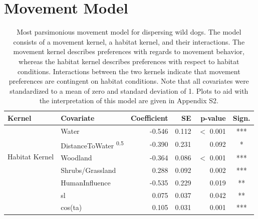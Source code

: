 \documentclass[abstract=off,10pt,a4paper,bibliography=totocnumbered]{article}
\begin{document}
\newpage
\section{Movement Model}
\begin{table}[htbp]
 \begin{center}
  \caption{Most parsimonious movement model for dispersing wild dogs. The model
   consists of a movement kernel, a habitat kernel, and their interactions. The
   movement kernel describes preferences with regards to movement behavior,
   whereas the habitat kernel describes preferences with respect to habitat
   conditions. Interactions between the two kernels indicate that movement
   preferences are contingent on habitat conditions. Note that all covariates
   were standardized to a mean of zero and standard deviation of 1. Plots to aid
   with the interpretation of this model are given in Appendix S2.}
  \label{MovementModelNumbers}
  \resizebox{\textwidth}{!} {
   \begin{threeparttable}
    \begin{tabular}{llrrrc}
     \toprule
     Kernel & Covariate                                       & Coefficient & SE    & p-value     & Sign. \\
     \midrule
     \multirow{5}{*}{Habitat Kernel}
            & Water                                           & -0.546      & 0.112 & \(<\) 0.001 & ***   \\
            & DistanceToWater \textsuperscript{0.5}           & -0.390      & 0.231 & 0.092       & *     \\
            & Woodland                                        & -0.364      & 0.086 & \(<\) 0.001 & ***   \\
            & Shrubs/Grassland                                & 0.288       & 0.092 & 0.002       & ***   \\
            & HumanInfluence                                  & -0.535      & 0.229 & 0.019       & **    \\
     \hdashline
     \multirow{6}{*}{Movement Kernel}
            & sl                                              & 0.075       & 0.037 & 0.042       & **    \\
            & cos(ta)                                         & 0.105       & 0.031 & 0.001       & ***   \\

\end{tabular}
\end{threeparttable}}
\end{center}
\end{table}
\end{document}
